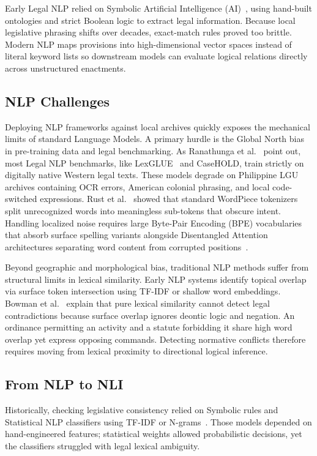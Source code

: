 Early Legal NLP relied on Symbolic Artificial Intelligence (AI)~\cite{katz_2023_legal_nlp}, using hand-built ontologies and strict Boolean logic to extract legal information. Because local legislative phrasing shifts over decades, exact-match rules proved too brittle. Modern NLP maps provisions into high-dimensional vector spaces instead of literal keyword lists so downstream models can evaluate logical relations directly across unstructured enactments.

    \subsection{NLP Challenges}
    Deploying NLP frameworks against local archives quickly exposes the mechanical limits of standard Language Models. A primary hurdle is the Global North bias in pre-training data and legal benchmarking. As Ranathunga et al.~\cite{ranathunga2022some} point out, most Legal NLP benchmarks, like LexGLUE~\cite{chalkidis2022lexglue} and CaseHOLD, train strictly on digitally native Western legal texts. These models degrade on Philippine LGU archives containing OCR errors, American colonial phrasing, and local code-switched expressions. Rust et al.~\cite{rust2021how} showed that standard WordPiece tokenizers split unrecognized words into meaningless sub-tokens that obscure intent. Handling localized noise requires large Byte-Pair Encoding (BPE) vocabularies that absorb surface spelling variants alongside Disentangled Attention architectures separating word content from corrupted positions~\cite{he2023debertav3}.

    Beyond geographic and morphological bias, traditional NLP methods suffer from structural limits in lexical similarity. Early NLP systems identify topical overlap via surface token intersection using TF-IDF or shallow word embeddings. Bowman et al.~\cite{bowman2015snli} explain that pure lexical similarity cannot detect legal contradictions because surface overlap ignores deontic logic and negation. An ordinance permitting an activity and a statute forbidding it share high word overlap yet express opposing commands. Detecting normative conflicts therefore requires moving from lexical proximity to directional logical inference.

    \subsection{From NLP to NLI}
    Historically, checking legislative consistency relied on Symbolic rules and Statistical NLP classifiers using TF-IDF or N-grams~\cite{katz_2023_legal_nlp}. Those models depended on hand-engineered features; statistical weights allowed probabilistic decisions, yet the classifiers struggled with legal lexical ambiguity.
    
